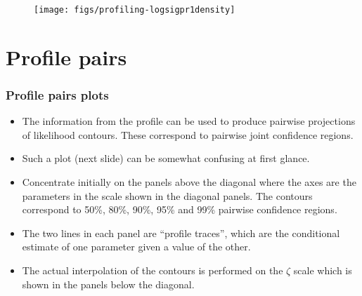 \documentclass[dvipsnames,pdflatex,beamer]{beamer}
\begin{document}
\begin{frame}
    \begin{figure}[tb]
      \centering
\texttt{[image: figs/profiling-logsigpr1density]}
    \end{figure}
\end{frame}

\section{Profile pairs}

\begin{frame}\frametitle{Profile pairs plots}
  \begin{itemize}
  \item The information from the profile can be used to produce
    pairwise projections of likelihood contours.  These correspond to
    pairwise joint confidence regions.
  \item Such a plot (next slide) can be somewhat confusing at first
    glance.
  \item Concentrate initially on the panels above the diagonal where
    the axes are the parameters in the scale shown in the diagonal
    panels.  The contours correspond to 50\%, 80\%, 90\%, 95\% and
    99\% pairwise confidence regions.
  \item The two lines in each panel are ``profile traces'', which are
    the conditional estimate of one parameter given a value of the other.
  \item The actual interpolation of the contours is performed on the
    $\zeta$ scale which is shown in the panels below the diagonal.
  \end{itemize}
\end{frame}
\end{document}

